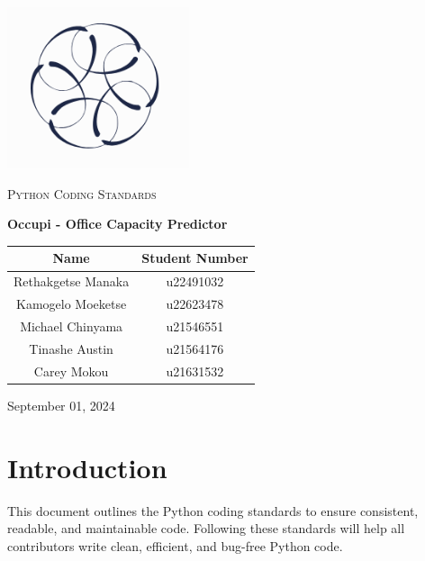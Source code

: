 \documentclass[11pt,a4paper]{article}
\begin{document}
\begin{titlepage}
    \centering
    \includegraphics[width=0.4\textwidth]{logo-white.png}\par\vspace{1cm}
    {\scshape\LARGE Python Coding Standards\par}
    \vspace{1.5cm}
    {\huge\bfseries Occupi - Office Capacity Predictor\par}
    \vspace{2.5cm}
    \begin{tabular}{|c|c|}
        \hline
        \textbf{Name}      & \textbf{Student Number} \\
        \hline
        Rethakgetse Manaka & u22491032               \\
        Kamogelo Moeketse  & u22623478               \\
        Michael Chinyama   & u21546551               \\
        Tinashe Austin     & u21564176               \\
        Carey Mokou        & u21631532               \\
        \hline
    \end{tabular}
    \vfill
    {\large September 01, 2024\par}
\end{titlepage}

\tableofcontents
\pagebreak


\section*{Introduction}
This document outlines the Python coding standards to ensure consistent, readable, and maintainable code. Following these standards will help all contributors write clean, efficient, and bug-free Python code.
\end{document}
